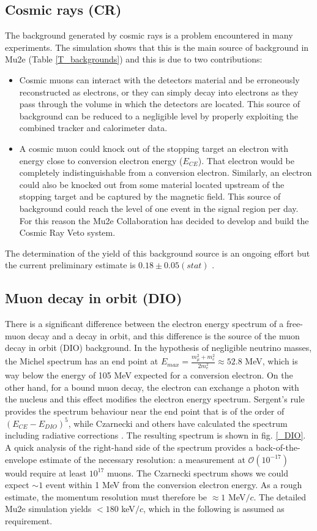 \documentclass[12pt,a4paper,openright, oneside, titlepage]{book} %
\begin{document}
\subsection{Cosmic rays (CR)}
The background generated by cosmic rays is a problem encountered in many experiments.
The simulation shows that this is the main source of background in Mu2e (Table \ref{T_backgrounds})
and this is due to two contributions:

\begin{itemize}
\item Cosmic muons can interact with the detectors material and be erroneously reconstructed as electrons, or they can simply decay into electrons as they pass through the volume in which the detectors are located. 
This source of background can be reduced to a negligible level by properly exploiting the combined tracker and calorimeter data.
\item A cosmic muon could knock out of the stopping target an electron with energy close to conversion electron energy ($E_{CE}$). 
That electron would be completely indistinguishable from a conversion electron. 
Similarly, an electron could also be knocked out from some material located upstream of the stopping target and be captured by the magnetic field. 
This source of background could reach the level of one event in the signal region per day.
For this reason the Mu2e Collaboration has decided to develop and build the Cosmic Ray Veto system.
\end{itemize}
The determination of the yield of this background source is an ongoing effort but the current preliminary estimate is $0.18\pm0.05(stat)$ \cite{CRV_now}.

\subsection{Muon decay in orbit (DIO)}
There is a significant difference between the electron energy spectrum of a free-muon decay and a decay in orbit, and this difference is the source of the muon decay in orbit (DIO) background.
In the hypothesis of negligible neutrino masses, the Michel spectrum has an end point at $E_{max}=\frac{m_\mu^2+m_e^2}{2m_e^2}\approx52.8$ MeV, which is way below the energy of 105 MeV expected for a conversion electron.
On the other hand, for a bound muon decay, the electron can exchange a photon with the nucleus and this effect modifies the electron energy spectrum. 
Sergent's rule provides the spectrum behaviour near the end point that is of the order of $(E_{CE}-E_{DIO})^5$, while Czarnecki and others have calculated the spectrum including radiative corrections \cite{Czarnecki} \cite{Czarnecki2015}.
The resulting spectrum is shown in fig. \ref{_DIO}.
A quick analysis of the right-hand side of the spectrum provides a back-of-the-envelope estimate of the necessary resolution: a measurement at $\mathcal{O}(10^{-17})$ would require at least $10^{17}$ muons. 
The Czarnecki spectrum shows we could expect $\sim1$ event within 1 MeV from the conversion electron energy. 
As a rough estimate, the momentum resolution must therefore be $\approx1$ MeV$/c$. 
The detailed Mu2e simulation yields $<180$ keV$/c$, which in the following is assumed as requirement.\\
\end{document}
